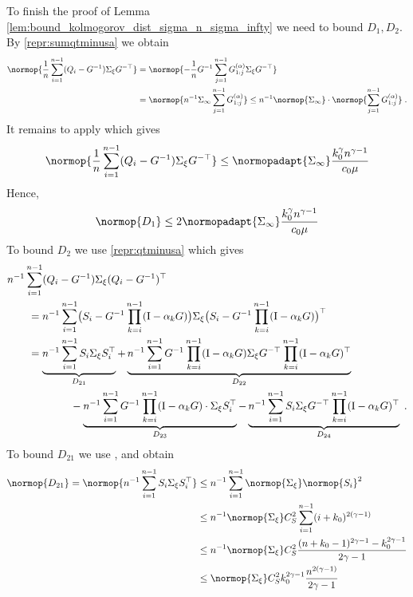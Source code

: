 To finish the proof of Lemma \ref{lem:bound_kolmogorov_dist_sigma_n_sigma_infty} we need to bound $D_1, D_2$. By \eqref{repr:sumqtminusa} we obtain
\begin{align}
\normop{\frac{1}{n}\sum_{i=1}^{n-1} (Q_i - G^{-1})\noisecov G^{-\top}} &= \normop{-\frac{1}{n} G^{-1} \sum_{j=1}^{n-1} G_{1:j}^{(\alpha)}\noisecov G^{-\top}} \\ &= \normop{n^{-1} \Sigma_{\infty}  \sum_{j=1}^{n-1} G_{1:j}^{(\alpha)}} \leq n^{-1} \normop{\Sigma_{\infty}} \cdot \normop{\sum_{j=1}^{n-1} G_{1:j}^{(\alpha)}} \eqsp. 
    \end{align}
    It remains to apply  which gives
    \begin{align}
        \normop{\frac{1}{n}\sum_{i=1}^{n-1} (Q_i - G^{-1})\noisecov G^{-\top}}  \leq \normopadapt{\Sigma_{\infty}} \frac{k_0^\gamma n^{\gamma-1}}{c_0\mu}
    \end{align}
    Hence, 
    \begin{align}
        \label{lemma:D1_bound}
        \normop{D_1} \leq 2 \normopadapt{\Sigma_{\infty}} \frac{k_0^\gamma n^{\gamma-1}}{c_0\mu}
    \end{align}
To bound $D_2$ we use \eqref{repr:qtminusa} which gives
    \begin{align}
        \label{lemma:D2_expanded_repr}
        &n^{-1}\sum_{i=1}^{n-1}(Q_i - G^{-1}) \Sigma_\xi (Q_i - G^{-1})^\top \\
        &\qquad = n^{-1}\sum_{i=1}^{n-1}\bigl(S_i - G^{-1} \prod_{k=i}^{n-1} (\mathrm{I} - \alpha_k G)\bigr) \Sigma_\xi \bigl(S_i - G^{-1} \prod_{k=i}^{n-1} (\mathrm{I} - \alpha_k G)\bigr)^\top \\
        &\qquad = \underbrace{n^{-1} \sum_{i=1}^{n-1} S_i \Sigma_\xi S_i^\top}_{D_{21}} + \underbrace{n^{-1}\sum_{i=1}^{n-1}G^{-1} \prod_{k=i}^{n-1} (\mathrm{I} - \alpha_k G) \Sigma_\xi G^{-\top} \prod_{k=i}^{n-1} (\mathrm{I} - \alpha_k G)^\top}_{D_{22}} \\ 
        &\qquad\qquad \qquad  -\underbrace{n^{-1} \sum_{i=1}^{n-1} G^{-1} \prod_{k=i}^{n-1} (\mathrm{I} - \alpha_k G) \cdot \Sigma_\xi S_i^\top}_{D_{23}} - \underbrace{n^{-1}\sum_{i=1}^{n-1} S_i \Sigma_\xi G^{-\top} \prod_{k=i}^{n-1} (\mathrm{I} - \alpha_k G)^{\top}}_{D_{24}}\;.
    \end{align}
    To bound $D_{21}$ we use  , and obtain 
    \begin{align}
        \label{lemma:D21_bound}
        \normop{D_{21}} = \normop{n^{-1} \sum_{i=1}^{n-1} S_i \noisecov S_i^\top} &\leq n^{-1} \sum_{i=1}^{n-1} \normop{\noisecov} \normop{S_i}^2 \\  &\leq
        n^{-1}\normop{\noisecov} C_{S}^2\sum_{i=1}^{n-1} (i + k_0)^{2(\gamma-1)}\\ &\leq n^{-1}\normop{\noisecov} C_{S}^2 \frac{(n + k_0-1)^{2\gamma-1}-k_0^{2\gamma-1}}{2\gamma-1}
        \\ &\leq \normop{\noisecov} C_{S}^2k_0^{2\gamma-1} \frac{n^{2(\gamma-1)}}{2\gamma-1}
    \end{align}
